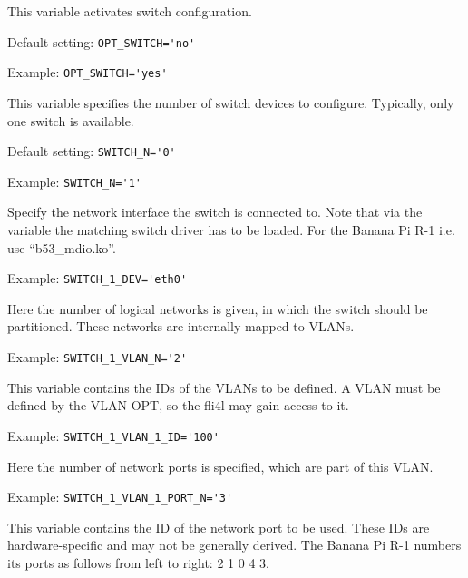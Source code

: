 \begin{description}

This variable activates switch configuration.

Default setting: \verb+OPT_SWITCH='no'+

Example: \verb+OPT_SWITCH='yes'+


This variable specifies the number of switch devices to configure. 
Typically, only one switch is available.

Default setting: \verb+SWITCH_N='0'+

Example: \verb+SWITCH_N='1'+


Specify the network interface the switch is connected to. Note that via the 
variable  the matching switch driver has to be loaded. For the 
Banana Pi R-1 i.e. use ``b53\_mdio.ko''.

Example: \verb+SWITCH_1_DEV='eth0'+


Here the number of logical networks is given, in which the switch should 
be partitioned. These networks are internally mapped to VLANs.

Example: \verb+SWITCH_1_VLAN_N='2'+


This variable contains the IDs of the VLANs to be defined. A VLAN must
be defined by the VLAN-OPT, so the fli4l may gain access to it.

Example: \verb+SWITCH_1_VLAN_1_ID='100'+


Here the number of network ports is specified, which are part of this VLAN.

Example: \verb+SWITCH_1_VLAN_1_PORT_N='3'+


This variable contains the ID of the network port to be used. These IDs
are hardware-specific and may not be generally derived.
The Banana Pi R-1 numbers its ports as follows from left to right:
2 1 0 4 3.


\end{description}
